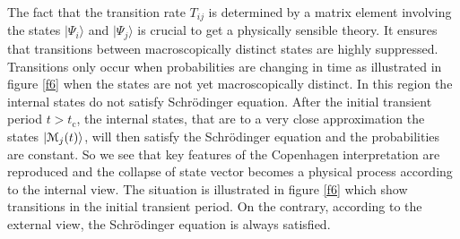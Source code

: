 \documentclass[12pt]{article}
\def\BM{{\EuScript M}}
\def\ket#1{| #1\rangle}
\begin{document}
The fact that the transition rate $T_{ij}$ is determined by a matrix element involving the states  $\ket{\Psi_i}$ and $\ket{\Psi_j}$ is crucial to get a physically sensible theory. It ensures that transitions between macroscopically distinct states are highly suppressed. Transitions only occur when probabilities are changing in time as illustrated in figure \ref{f6} when the states are not yet macroscopically distinct. In this region the internal states do not satisfy Schr\"odinger equation.
After the initial transient period $t>t_\text{c}$, the internal states, that are to a very close approximation the states $\ket{\BM_j(t)}$, will then satisfy the Schr\"odinger equation and the probabilities are constant. So we see that key features of the Copenhagen interpretation are reproduced and the collapse of state vector becomes a physical process according to the internal view. The situation is illustrated in figure \ref{f6} which show transitions in the initial transient period. On the contrary, according to the external view, the Schr\"odinger equation is always satisfied. 
\end{document}
